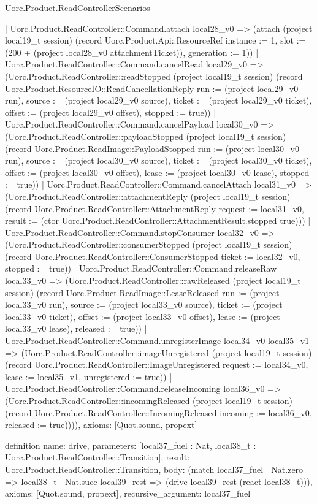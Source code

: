 \begin{lexlean}{Uorc.Product.ReadControllerScenarios}
\begin{semanticmodule}
{      | Uorc.Product.ReadController::Command.attach local28_v0 => (attach (project local19_t session) (record Uorc.Product.Api::ResourceRef {instance := 1, slot := (200 + (project local28_v0 attachmentTicket)), generation := 1}))
      | Uorc.Product.ReadController::Command.cancelRead local29_v0 => (Uorc.Product.ReadController::readStopped (project local19_t session) (record Uorc.Product.ResourceIO::ReadCancellationReply {run := (project local29_v0 run), source := (project local29_v0 source), ticket := (project local29_v0 ticket), offset := (project local29_v0 offset), stopped := true}))
      | Uorc.Product.ReadController::Command.cancelPayload local30_v0 => (Uorc.Product.ReadController::payloadStopped (project local19_t session) (record Uorc.Product.ReadImage::PayloadStopped {run := (project local30_v0 run), source := (project local30_v0 source), ticket := (project local30_v0 ticket), offset := (project local30_v0 offset), lease := (project local30_v0 lease), stopped := true}))
      | Uorc.Product.ReadController::Command.cancelAttach local31_v0 => (Uorc.Product.ReadController::attachmentReply (project local19_t session) (record Uorc.Product.ReadController::AttachmentReply {request := local31_v0, result := (ctor Uorc.Product.ReadController::AttachmentResult.stopped true)}))
      | Uorc.Product.ReadController::Command.stopConsumer local32_v0 => (Uorc.Product.ReadController::consumerStopped (project local19_t session) (record Uorc.Product.ReadController::ConsumerStopped {ticket := local32_v0, stopped := true}))
      | Uorc.Product.ReadController::Command.releaseRaw local33_v0 => (Uorc.Product.ReadController::rawReleased (project local19_t session) (record Uorc.Product.ReadImage::LeaseReleased {run := (project local33_v0 run), source := (project local33_v0 source), ticket := (project local33_v0 ticket), offset := (project local33_v0 offset), lease := (project local33_v0 lease), released := true}))
      | Uorc.Product.ReadController::Command.unregisterImage local34_v0 local35_v1 => (Uorc.Product.ReadController::imageUnregistered (project local19_t session) (record Uorc.Product.ReadController::ImageUnregistered {request := local34_v0, lease := local35_v1, unregistered := true}))
      | Uorc.Product.ReadController::Command.releaseIncoming local36_v0 => (Uorc.Product.ReadController::incomingReleased (project local19_t session) (record Uorc.Product.ReadController::IncomingReleased {incoming := local36_v0, released := true})))),
  axioms: [Quot.sound, propext]
}

definition{
  name: drive,
  parameters: [local37_fuel : Nat, local38_t : Uorc.Product.ReadController::Transition],
  result: Uorc.Product.ReadController::Transition,
  body: (match local37_fuel
    | Nat.zero => local38_t
    | Nat.succ local39_rest => (drive local39_rest (react local38_t))),
  axioms: [Quot.sound, propext],
  recursive_argument: local37_fuel
}


\end{semanticmodule}
\end{lexlean}
